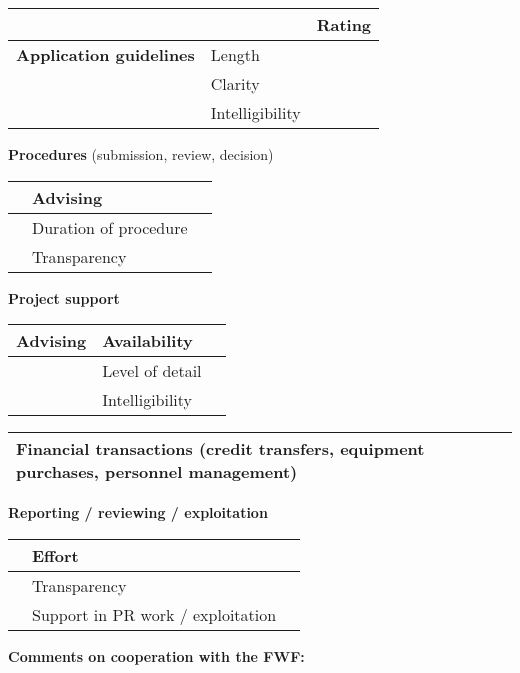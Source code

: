 \documentclass[a4paper, 11pt]{article}
\begin{document}
\begin{tabular}{|p{5cm}|p{7cm}|>{\centering\arraybackslash}m{1.2cm}|}
\multicolumn{2}{c}{} & \multicolumn{1}{c}{{\color{gray}\textbf{Rating}}} \\
\hline
\textbf{Application guidelines} & Length & \\
\hline
 & Clarity & \\
\hline
 & Intelligibility & \\
\hline
\end{tabular}

\textbf{Procedures} (submission, review, decision)

\begin{tabular}{|p{5cm}|p{7cm}|>{\centering\arraybackslash}m{1.2cm}|}
\hline
 & Advising & \\
\hline
 & Duration of procedure & \\
\hline
 & Transparency & \\
\hline
\end{tabular}

\textbf{Project support}

\begin{tabular}{|p{5cm}|p{7cm}|>{\centering\arraybackslash}m{1.2cm}|}
\hline
\textbf{Advising} & Availability & \\
\hline
 & Level of detail & \\
\hline
 & Intelligibility & \\
\hline
\end{tabular}

\begin{tabular}{|p{12.4cm}|>{\centering\arraybackslash}m{1.2cm}|}
\hline
\textbf{Financial transactions} \newline
(credit transfers, equipment purchases, personnel management) & \\
\hline
\end{tabular}

\textbf{Reporting / reviewing / exploitation}

\begin{tabular}{|p{5cm}|p{7cm}|>{\centering\arraybackslash}m{1.2cm}|}
\hline
 & Effort & \\
\hline
 & Transparency & \\
\hline
 & Support in PR work / exploitation & \\
\hline
\end{tabular}

\newpage
\textbf{Comments on cooperation with the FWF:}
\end{document}
